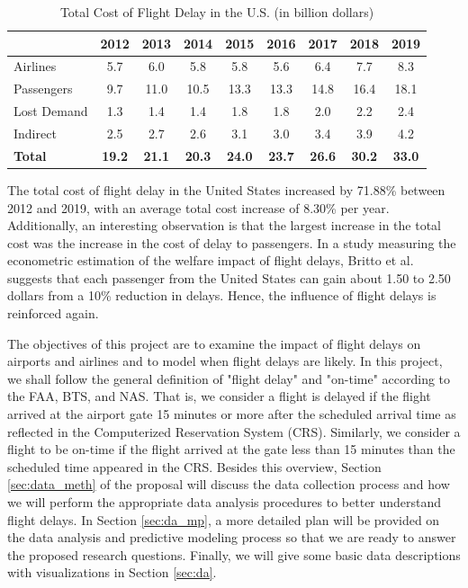 \documentclass[11pt, letterpaper]{article}
\begin{document}
\begin{table}[h!]
\centering
\begin{tabular}{lcccccccc}
             & 2012 & 2013 & 2014 & 2015 & 2016 & 2017 & 2018 & 2019 \\ 
\hline
 Airlines    & 5.7  & 6.0  & 5.8  & 5.8  & 5.6  & 6.4  & 7.7  & 8.3 \\  
 Passengers  & 9.7  & 11.0 & 10.5 & 13.3 & 13.3 & 14.8 & 16.4 & 18.1 \\
 Lost Demand & 1.3  & 1.4  & 1.4  & 1.8  & 1.8  & 2.0  & 2.2  & 2.4 \\
 Indirect    & 2.5  & 2.7  & 2.6  & 3.1  & 3.0  & 3.4  & 3.9  & 4.2 \\
\hline
 \textbf{Total} & \textbf{19.2} & \textbf{21.1} & \textbf{20.3} & \textbf{24.0} & \textbf{23.7} & \textbf{26.6} & \textbf{30.2} & \textbf{33.0}
\end{tabular}\caption{Total Cost of Flight Delay in the U.S. (in billion dollars)}\label{tab:cost}
\end{table}

The total cost of flight delay in the United States increased by 71.88\% between 2012 and 2019, with an average total cost increase of 8.30\% per year. Additionally, an interesting observation is that the largest increase in the total cost was the increase in the cost of delay to passengers. In a study measuring the econometric estimation of the welfare impact of flight delays, Britto et al. \cite{ar:britto_dresner_voltes} suggests that each passenger from the United States can gain about 1.50 to 2.50 dollars from a 10\% reduction in delays. Hence, the influence of flight delays is reinforced again.

The objectives of this project are to examine the impact of flight delays on airports and airlines and to model when flight delays are likely. In this project, we shall follow the general definition of "flight delay" and "on-time" according to the FAA, BTS, and NAS. That is, we consider a flight is delayed if the flight arrived at the airport gate 15 minutes or more after the scheduled arrival time as reflected in the Computerized Reservation System (CRS). Similarly, we consider a flight to be on-time if the flight arrived at the gate less than 15 minutes than the scheduled time appeared in the CRS. Besides this overview, Section \ref{sec:data_meth} of the proposal will discuss the data collection process and how we will perform the appropriate data analysis procedures to better understand flight delays. In Section \ref{sec:da_mp}, a more detailed plan will be provided on the data analysis and predictive modeling process so that we are ready to answer the proposed research questions. Finally, we will give some basic data descriptions with visualizations in Section \ref{sec:da}.
\end{document}
